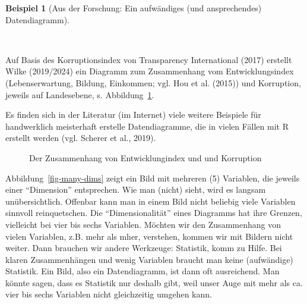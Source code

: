 \documentclass[
  letterpaper,
  twoside,
  open=any]{scrbook}
\theoremstyle{definition}
\theoremstyle{definition}
\newtheorem{example}{Beispiel}[chapter]
\theoremstyle{definition}
\theoremstyle{remark}
\begin{document}
\begin{example}[Aus der Forschung: Ein aufwändiges (und ansprechendes)
Datendiagramm]\protect\hypertarget{exm-datendiagramm}{}\label{exm-datendiagramm}

~

Auf Basis des Korruptionsindex von Transparency International (2017)
erstellt Wilke (2019/2024) ein Diagramm zum Zusammenhang vom
Entwicklungsindex (Lebenserwartung, Bildung, Einkommen; vgl. Hou et al.
(2015)) und Korruption, jeweils auf Landesebene, s.
Abbildung~\ref{fig-develop-corrupt}.

Es finden sich in der Literatur (im Internet) viele weitere Beispiele
für handwerklich meisterhaft erstelle Datendiagramme, die in vielen
Fällen mit R erstellt werden (vgl. Scherer et al., 2019).

\begin{figure}


\caption{\label{fig-develop-corrupt}Der Zusammenhang von
Entwicklungindex und und Korruption}

\end{figure}%

\end{example}

Abbildung~\ref{fig-many-dims} zeigt ein Bild mit mehreren (5) Variablen,
die jeweils einer \enquote{Dimension} entsprechen. Wie man (nicht)
sieht, wird es langsam unübersichtlich. Offenbar kann man in einem Bild
nicht beliebig viele Variablen sinnvoll reinquetschen. Die
\enquote{Dimensionalität} eines Diagramms hat ihre Grenzen, vielleicht
bei vier bis sechs Variablen. Möchten wir den Zusammenhang von vielen
Variablen, z.B. mehr als mher, verstehen, kommen wir mit Bildern nicht
weiter. Dann brauchen wir andere Werkzeuge: Statistik, komm zu Hilfe.
Bei klaren Zusammenhängen und wenig Variablen braucht man keine
(aufwändige) Statistik. Ein Bild, also ein Datendiagramm, ist dann oft
ausreichend. Man könnte sagen, dass es Statistik nur deshalb gibt, weil
unser Auge mit mehr als ca. vier bis sechs Variablen nicht gleichzeitig
umgehen kann.
\end{document}

